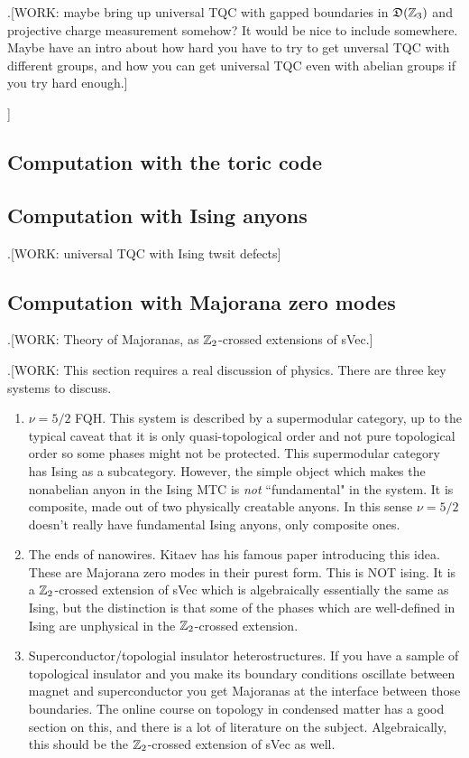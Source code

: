 .[WORK: maybe bring up universal TQC with gapped boundaries in $\mathfrak{D}(\mathbb{Z}_3)$ and projective charge measurement somehow? It would be nice to include somewhere. Maybe have an intro about how hard you have to try to get unversal TQC with different groups, and how you can get universal TQC even with abelian groups if you try hard enough.]

]
\subsection{Computation with the toric code}


\subsection{Computation with Ising anyons}

.[WORK: universal TQC with Ising twsit defects]

\subsection{Computation with Majorana zero modes}

.[WORK: Theory of Majoranas, as $\mathbb{Z}_2$-crossed extensions of sVec.]

.[WORK: This section requires a real discussion of physics. There are three key systems to discuss.

\begin{enumerate}
\item $\nu=5/2$ FQH. This system is described by a supermodular category, up to the typical caveat that it is only quasi-topological order and not pure topological order so some phases might not be protected. This supermodular category has Ising as a subcategory. However, the simple object which makes the nonabelian anyon in the Ising MTC is \textit{not} ``fundamental" in the system. It is composite, made out of two physically creatable anyons. In this sense $\nu =5/2$ doesn't really have fundamental Ising anyons, only composite ones.

\item The ends of nanowires. Kitaev has his famous paper introducing this idea. These are Majorana zero modes in their purest form. This is NOT ising. It is a $\mathbb{Z}_2$-crossed extension of sVec which is algebraically essentially the same as Ising, but the distinction is that some of the phases which are well-defined in Ising are unphysical in the $\mathbb{Z}_2$-crossed extension.

\item Superconductor/topologial insulator heterostructures. If you have a sample of topological insulator and you make its boundary conditions oscillate between magnet and superconductor you get Majoranas at the interface between those boundaries. The online course on topology in condensed matter has a good section on this, and there is a lot of literature on the subject. Algebraically, this should be the $\mathbb{Z}_2$-crossed extension of sVec as well.
\end{enumerate}

